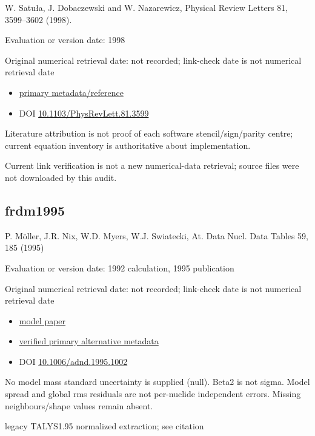 \documentclass[
  11pt,
  letterpaper,
]{article}
\providecommand{\tightlist}{%
  \setlength{\itemsep}{0pt}\setlength{\parskip}{0pt}}
\begin{document}
W. Satuła, J. Dobaczewski and W. Nazarewicz, Physical Review Letters 81,
3599--3602 (1998).

Evaluation or version date: 1998

Original numerical retrieval date: not recorded; link-check date is not
numerical retrieval date

\begin{itemize}
\tightlist
\item
  \href{https://journals.aps.org/prl/abstract/10.1103/PhysRevLett.81.3599}{primary
  metadata/reference}
\item
  DOI
  \href{https://doi.org/10.1103/PhysRevLett.81.3599}{10.1103/PhysRevLett.81.3599}
\end{itemize}

Literature attribution is not proof of each software stencil/sign/parity
centre; current equation inventory is authoritative about
implementation.

Current link verification is not a new numerical-data retrieval; source
files were not downloaded by this audit.

\subsection{frdm1995}\label{frdm1995}

P. Möller, J.R. Nix, W.D. Myers, W.J. Swiatecki, At. Data Nucl. Data
Tables 59, 185 (1995)

Evaluation or version date: 1992 calculation, 1995 publication

Original numerical retrieval date: not recorded; link-check date is not
numerical retrieval date

\begin{itemize}
\tightlist
\item
  \href{https://doi.org/10.1006/adnd.1995.1002}{model paper}
\item
  \href{https://arxiv.org/abs/nucl-th/9308022}{verified primary
  alternative metadata}
\item
  DOI
  \href{https://doi.org/10.1006/adnd.1995.1002}{10.1006/adnd.1995.1002}
\end{itemize}

No model mass standard uncertainty is supplied (null). Beta2 is not
sigma. Model spread and global rms residuals are not per-nuclide
independent errors. Missing neighbours/shape values remain absent.

legacy TALYS1.95 normalized extraction; see citation
\end{document}
